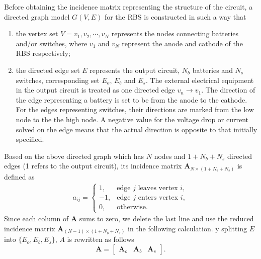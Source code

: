 \documentclass{article}
\begin{document}
Before obtaining the incidence matrix representing the structure of the circuit, a directed graph model $G(V,E)$ for the RBS is constructed in such a way that
\begin{enumerate}[(1)]
    \item the vertex set $V={v_1,v_2,\cdots,v_N}$ represents the nodes connecting batteries and/or switches, where $v_1$ and $v_N$ represent the anode and cathode of the RBS respectively;
    \item the directed edge set $E$ represents the output circuit, $N_b$ batteries and $N_s$ switches, corresponding set $E_o$, $E_b$ and $E_s$. The external electrical equipment in the output circuit is treated as one directed edge $v_n \to v_1$. The direction of the edge representing a battery is set to be from the anode to the cathode. For the edges representing switches, their directions are marked from the low node to the the high node. A negative value for the voltage drop or current solved on the edge means that the actual direction is opposite to that initially specified.
\end{enumerate}


Based on the above directed graph which has $N$ nodes and $1+N_b+N_s$ directed edges (1 refers to the output circuit), its incidence matrix $\bm{A}_{N\times (1+N_b+N_s)}$ is defined as
\begin{align}\label{eq:A}
    a_{ij}=
    \begin{cases}
        1,  & \text{edge  $j$ leaves vertex $i$},\\
        -1, & \text{edge $j$ enters vertex $i$},\\
        0,  & \text{otherwise}.
    \end{cases}
\end{align}
Since each column of $\bm{A}$ sums to zero, we delete the last line and use the reduced incidence matrix $\bm{A}_{(N-1)\times(1+N_b+N_s)}$ in the following calculation.
y splitting $E$ into $\{E_o, E_b, E_s\}$, $A$ is rewritten as follows
\begin{equation}
    \bm{A} =
    \begin{bmatrix}
        \bm{A}_o & \bm{A}_b & \bm{A}_s
    \end{bmatrix}.
\end{equation}
\end{document}
